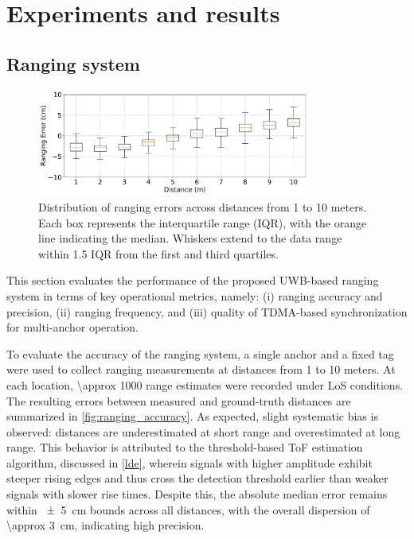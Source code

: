 \chapter{Experiments and results}

\section{Ranging system}

\begin{figure}[tbh]
    \centering
    \includegraphics[width=0.8\textwidth]{Graphics/accuracy.pdf}
    \caption[Distribution of ranging errors.]{Distribution of ranging errors across distances from 1 to 10 meters. Each box represents the interquartile range (IQR), with the orange line indicating the median. Whiskers extend to the data range within 1.5 IQR from the first and third quartiles.}
    \label{fig:ranging_accuracy}
\end{figure}

This section evaluates the performance of the proposed UWB-based ranging system in terms of key operational metrics, namely: (i) ranging accuracy and precision, (ii) ranging frequency, and (iii) quality of TDMA-based synchronization for multi-anchor operation. 

To evaluate the accuracy of the ranging system, a single anchor and a fixed tag were used to collect ranging measurements at distances from 1 to 10 meters. At each location, \SI{\approx 1000}{} range estimates were recorded under LoS conditions. The resulting errors between measured and ground-truth distances are summarized in \autoref{fig:ranging_accuracy}. As expected, slight systematic bias is observed: distances are underestimated at short range and overestimated at long range. This behavior is attributed to the threshold-based ToF estimation algorithm, discussed in \autoref{lde}, wherein signals with higher amplitude exhibit steeper rising edges and thus cross the detection threshold earlier than weaker signals with slower rise times.  Despite this, the absolute median error remains within \SI{\pm 5}{\centi\metre} bounds across all distances, with the overall dispersion of \SI{\approx 3}{\centi\metre}, indicating high precision.

